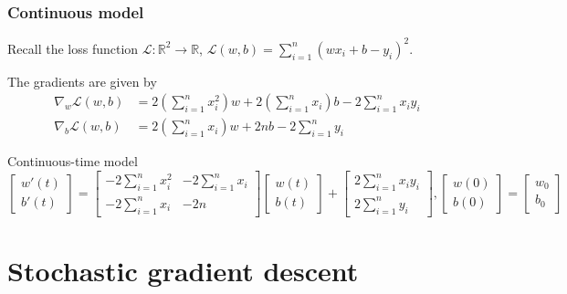 \documentclass[17pt,institute=e10]{tuhh_presentation}
\newcommand{\R}{\mathbb{R}}
\newcommand{\CL}{\mathcal{L}}
\begin{document}
\begin{frame}[fragile]
  \frametitle{Continuous model}
  Recall the loss function $\CL : \R^2 \rightarrow \R$, $\CL(w, b) = \sum_{i=1}^n (w x_i + b - y_i)^2$.

  The gradients are given by 
  \begin{align*}
    \nabla_w \CL(w,b) &= 2\left(\sum_{i=1}^n x_i^2 \right) w + 2\left(\sum_{i=1}^n x_i \right) b - 2 \sum_{i=1}^n x_i y_i \\
    \nabla_b \CL(w,b) &= 2\left(\sum_{i=1}^n x_i \right) w + 2 n b - 2 \sum_{i=1}^n y_i
  \end{align*}
  \begin{block}{Continuous-time model}
  \begin{equation*}
    \begin{bmatrix}
      w'(t)      \\
      b'(t)     
  \end{bmatrix}
  = 
  \begin{bmatrix}
    -2  \displaystyle\sum_{i=1}^n x_i^2  &  -2  \displaystyle\sum_{i=1}^n x_i      \\
      -2  \displaystyle\sum_{i=1}^n x_i  &  -2n      
  \end{bmatrix}
  \begin{bmatrix}
    w(t)     \\
    b(t)    
  \end{bmatrix}
  +
  \begin{bmatrix}
    2  \displaystyle\sum_{i=1}^n x_i y_i     \\
    2  \displaystyle\sum_{i=1}^n y_i    
  \end{bmatrix},
  \begin{bmatrix}
    w(0)     \\
    b(0)    
  \end{bmatrix}
  =
  \begin{bmatrix}
    w_0     \\
    b_0   
  \end{bmatrix}
  \end{equation*}
  
  \end{block}
\end{frame}

\section{Stochastic gradient descent}
\end{document}
